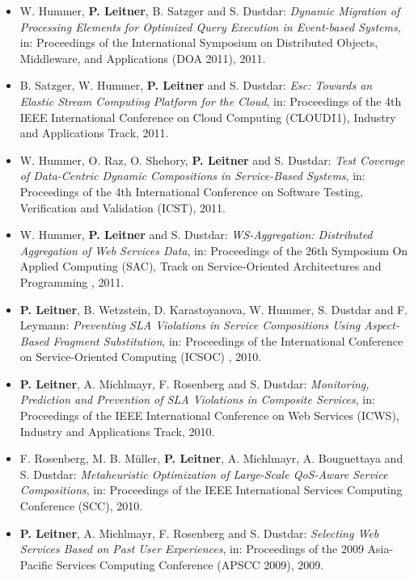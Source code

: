 \documentclass[paper=letter,fontsize=11pt]{scrartcl} %
\begin{document}
\begin{itemize}
(NWeSP\'11), 2011. 
\item W. Hummer, \textbf{P. Leitner}, B. Satzger and S. Dustdar:
\emph{Dynamic Migration of Processing Elements for Optimized Query Execution in
Event-based Systems}, in: Proceedings of the International Symposium on Distributed
Objects, Middleware, and Applications (DOA 2011), 2011. 
\item B. Satzger, W. Hummer, \textbf{P. Leitner} and S. Dustdar:
\emph{Esc: Towards an Elastic Stream Computing Platform for the Cloud},
in: Proceedings of the 4th IEEE International Conference on Cloud Computing (CLOUD\'11), Industry and Applications Track, 2011. 
\item W. Hummer, O. Raz, O. Shehory, \textbf{P. Leitner} and S. Dustdar:
\emph{Test Coverage of Data-Centric Dynamic Compositions in Service-Based
Systems}, in: Proceedings of the 4th International Conference on Software Testing,
Verification and Validation (ICST), 2011. 
\item W. Hummer, \textbf{P. Leitner} and S. Dustdar: \emph{WS-Aggregation: Distributed Aggregation of Web Services Data}, in: Proceedings of the 26th Symposium On Applied Computing (SAC), Track on Service-Oriented Architectures and Programming , 2011. 
\item \textbf{P. Leitner}, B. Wetzstein, D. Karastoyanova, W. Hummer, S. Dustdar and F. Leymann: \emph{Preventing SLA Violations in Service Compositions Using Aspect-Based Fragment Substitution}, in: Proceedings of the International Conference on Service-Oriented Computing (ICSOC) , 2010. 
\item \textbf{P. Leitner}, A. Michlmayr, F. Rosenberg and S. Dustdar: \emph{Monitoring, Prediction and Prevention of SLA Violations in Composite Services}, in: Proceedings of the IEEE International Conference on Web Services (ICWS), Industry and Applications Track, 2010. 
\item F. Rosenberg, M. B. M\"uller, \textbf{P. Leitner}, A. Michlmayr, A. Bouguettaya
and S. Dustdar: \emph{Metaheuristic Optimization of Large-Scale QoS-Aware Service Compositions}, in: Proceedings of the IEEE International Services Computing Conference (SCC), 2010. 
\item \textbf{P. Leitner}, A. Michlmayr, F. Rosenberg and S. Dustdar: \emph{Selecting Web Services Based on Past User Experiences}, in: Proceedings of the 2009 Asia-Pacific Services Computing Conference (APSCC 2009), 2009. 

\end{itemize}
\end{document}
